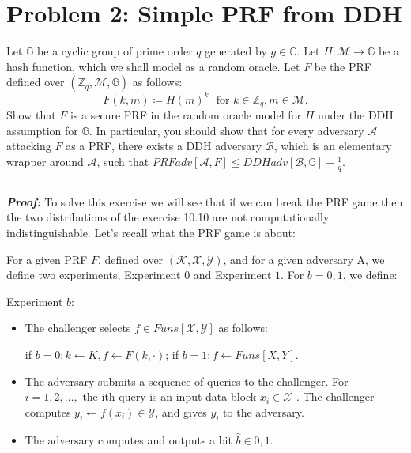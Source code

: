 \section{Problem 2: Simple PRF from DDH}\label{sec:problem2}

Let $\mathbb{G}$ be a cyclic group of prime order $q$ generated by $g \in \mathbb{G}$.
Let $H : \mathcal{M} \rightarrow \mathbb{G}$ be a hash function, which we shall model as a random oracle.
Let $F$ be the PRF defined over $(\mathbb{Z}_{q},\mathcal{M},\mathbb{G})$ as follows:
\begin{equation*}
    F(k,m) \coloneqq H(m)^{k} \hspace{8pt} \text{for } k \in \mathbb{Z}_{q}, m \in \mathcal{M}.
\end{equation*}
Show that $F$ is a secure PRF in the random oracle model for $H$ under the DDH assumption for $\mathbb{G}$.
In particular, you should show that for every adversary $\mathcal{A}$ attacking $F$ as a PRF, there exists a DDH adversary $\mathcal{B}$, which is an elementary wrapper around $\mathcal{A}$, such that $PRFadv[\mathcal{A}, F] \leq DDHadv[\mathcal{B}, \mathbb{G}] + \frac{1}{q}$.

\begin{center}
    \rule{5cm}{0.4pt}
\end{center}

\textbf{\textit{Proof:}}
To solve this exercise we will see that if we can break the PRF game then the two distributions of the exercise 10.10 are not computationally indistinguishable.
Let's recall what the PRF game is about:

For a given PRF $F$, defined over $(\mathcal{K}, \mathcal{X} , \mathcal{Y})$, and for a given adversary
A, we define two experiments, Experiment $0$ and Experiment $1$. For $b=0,1$, we define:

Experiment $b$:
\begin{itemize}
\item 
The challenger selects $f \in Funs[\mathcal{X},\mathcal{Y}]$ as follows:

if $b = 0: k\leftarrow K, f\leftarrow F(k, ·)$;
if $b = 1: f\leftarrow Funs[X , Y]$.
\item 
The adversary submits a sequence of queries to the challenger.
For $i = 1, 2,\ldots,$ the ith query is an input data block $x_{i}\in\mathcal{X}$ .
The challenger computes $y_{i}\leftarrow f(x_{i})\in \mathcal{Y}$, and gives $y_{i}$ to the adversary.
\item
The adversary computes and outputs a bit $\hat{b}\in {0,1}$.
\end{itemize}

